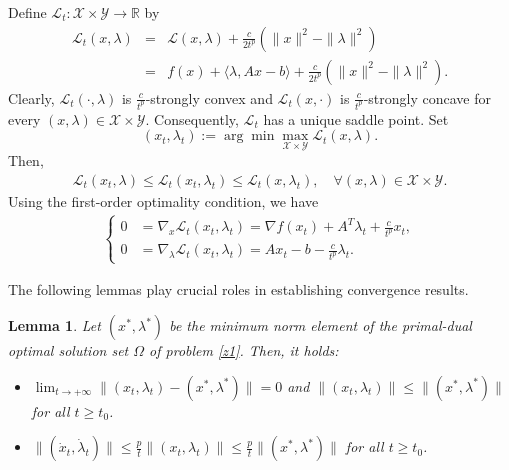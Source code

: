 \documentclass[review]{elsarticle}
\newtheorem{lemma}{Lemma}[section]
\begin{document}
	Define $\mathcal{L}_{t} : \mathcal{X}\times\mathcal{Y}\rightarrow\mathbb{R}$  by
	\begin{eqnarray}\label{z3}
		\mathcal{L}_{t}(x,\lambda)&=&\mathcal{L}(x,\lambda)+\frac{c}{2t^p}\left(\|x\|^2-\|\lambda\|^2\right)\\
		&=&f(x)+\langle \lambda, Ax-b\rangle+\frac{c}{2t^p}\left(\|x\|^2-\|\lambda\|^2\right).\nonumber
	\end{eqnarray}
Clearly, $\mathcal{L}_{t}(\cdot,\lambda)$ is $\frac{c}{t^p}$-strongly convex and    $\mathcal{L}_{t}(x,\cdot)$ is $\frac{c}{t^p}$-strongly concave for every $(x,\lambda)\in  \mathcal{X}\times\mathcal{Y}$. Consequently, $\mathcal{L}_{t}$ has a unique saddle point. Set 
	$$(x_t,\lambda_t) :=\arg\min\max_{\mathcal{X}\times\mathcal{Y}}\mathcal{L}_{t}(x, \lambda).$$
	Then,
	\begin{eqnarray}\label{zv1}
		\mathcal{L}_{t}(x_t, \lambda)\leq\mathcal{L}_{t}(x_t, \lambda_t)\leq\mathcal{L}_{t}(x, \lambda_t), \quad \forall (x, \lambda)\in\mathcal{X}\times\mathcal{Y}.
	\end{eqnarray}
Using the first-order optimality condition, we have
	\begin{eqnarray}\label{z4}
		\begin{cases}
			0&=\nabla_{x}\mathcal{L}_{t}(x_t, \lambda_t)=\nabla f(x_t)+A^T\lambda_t+\frac{c}{t^p}x_t,\\
			0&=\nabla_{\lambda}\mathcal{L}_{t}(x_t, \lambda_t)=Ax_t-b-\frac{c}{t^p}\lambda_t.
		\end{cases}
	\end{eqnarray} 

The following lemmas play  crucial roles in establishing  convergence results.

	\begin{lemma}\label{lemma2.1}\cite[Lemma 2.3]{ChbaniRBOn(2024)}
		Let $(x^*,\lambda^*)$ be the minimum norm element of the primal-dual optimal solution set $\Omega$ of problem \eqref{z1}.  Then, it holds:
		\begin{itemize}
			\item[(i)] $\lim_{t\rightarrow+\infty}\|(x_t,\lambda_t)-(x^*,\lambda^*)\|=0$ and $\|(x_t,\lambda_t)\|\leq \|(x^*,\lambda^*)\|$  for all $t\geq t_0$.
			\item[(ii)] $\|(\dot{x}_t, \dot{\lambda}_t)\|\leq\frac{p}{t}\|(x_t,\lambda_t)\|\leq\frac{p}{t}\|(x^*,\lambda^*)\|$  for all $t\geq t_0$.
		\end{itemize}
	\end{lemma}
	
\end{document}
